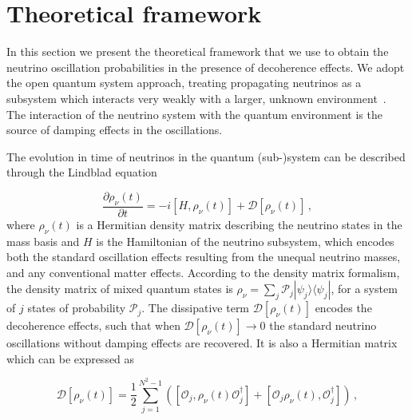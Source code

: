 \documentclass[aps, prd, onecolumn, tightenlines, notitlepage, superscriptaddress, nofootinbib, preprintnumbers, floatfix,showkeys,11pt]{revtex4-2}
\begin{document}
\section{Theoretical framework}
\label{sec:theory}
In this section we present the theoretical framework that we use to obtain the neutrino oscillation probabilities in the presence of decoherence effects. We adopt the open quantum system approach, treating propagating neutrinos as a subsystem which interacts very weakly with a larger, unknown environment~\cite{Alicki:1105909, Breuer:2002pc}. The interaction of the neutrino system with the quantum environment is the source of damping effects in the oscillations.

The evolution in time of neutrinos in the quantum (sub-)system can be described through the Lindblad  equation~\cite{Lindblad:1975ef,Gorini:1975nb}

\begin{equation}
	\frac{\partial\rho_\nu(t)}{\partial t}=-i[H,\rho_\nu(t)] + \mathcal{D}[\rho_\nu(t)]\,,
    \label{eq:rho_time_dep}
\end{equation}
where $\rho_\nu(t)$ is a Hermitian density matrix describing the neutrino states in the mass basis and $H$ is the Hamiltonian of the neutrino subsystem, which encodes both the standard oscillation effects resulting from the unequal neutrino masses, and any conventional matter effects.
%
According to the density matrix formalism, the density matrix of mixed quantum states is $\rho_\nu = \sum_j \mathcal{P}_j |\psi_j \rangle \langle \psi_j|$, for a system of $j$ states of probability $\mathcal{P}_j$.
%
The dissipative term $\mathcal{D}[\rho_\nu(t)]$ encodes the decoherence effects, such that when $\mathcal{D}[\rho_\nu(t)] \to 0$ the standard neutrino oscillations without damping effects are recovered.  It is also a Hermitian matrix which can be expressed as~\cite{Gago:2002na,Benatti:2000ph,Lisi:2000zt,Stuttard:2020qfv}

\begin{equation}
\label{eq:DecTerm}
\mathcal{D}[\rho_\nu(t)]=\frac{1}{2}\sum_{j=1}^{N^2-1} \left([\mathcal{O}_j,\rho_\nu(t) \mathcal{O}_j^{\dagger}]+[\mathcal{O}_j\rho_\nu(t), \mathcal{O}_j^{\dagger}] \right) \, ,
\end{equation}
\end{document}
